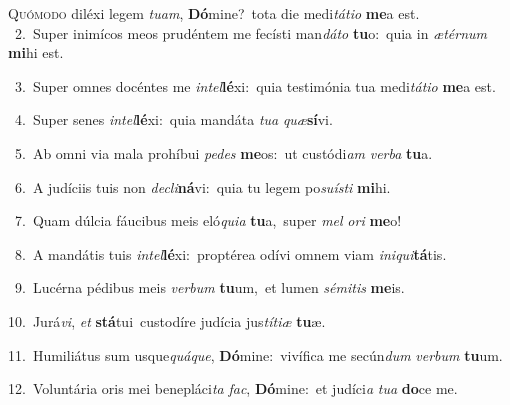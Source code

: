 \lettrine{\initial\textcolor{\initialcolor}{Q}}{uómodo} diléxi legem \textit{tu}\-\textit{am}, \textbf{Dó}\-mine?~\star tota die medi\-\textit{tá}\-\textit{ti}\textit{o} \textbf{me}\-a est.\\
{\numbfont\textcolor{\numbcolor}{~2.}}~Super inimícos meos prudéntem me fecísti man\-\textit{dá}\-\textit{to} \textbf{tu}\-o:~\star quia in \textit{æ}\-\textit{tér}\textit{num} \textbf{mi}\-hi est.\par
{\numbfont\textcolor{\numbcolor}{~3.}}~Super omnes docéntes me \textit{in}\-\textit{tel}\textbf{lé}xi:~\star quia testimónia tua medi\-\textit{tá}\-\textit{ti}\textit{o} \textbf{me}\-a est.\par
{\numbfont\textcolor{\numbcolor}{~4.}}~Super senes \textit{in}\-\textit{tel}\textbf{lé}xi:~\star quia mandáta \textit{tu}\-\textit{a} \textit{quæ}\-\textbf{sí}vi.\par
{\numbfont\textcolor{\numbcolor}{~5.}}~Ab omni via mala prohíbui \textit{pe}\-\textit{des} \textbf{me}\-os:~\star ut custódi\textit{am} \textit{ver}\-\textit{ba} \textbf{tu}\-a.\par
{\numbfont\textcolor{\numbcolor}{~6.}}~A judíciis tuis non \textit{de}\-\textit{cli}\textbf{ná}vi:~\star quia tu legem po\-\textit{su}\-\textit{ís}\textit{ti} \textbf{mi}\-hi.\par
{\numbfont\textcolor{\numbcolor}{~7.}}~Quam dúlcia fáucibus meis eló\-\textit{qui}\-\textit{a} \textbf{tu}\-a,~\star super \textit{mel} \textit{o}\-\textit{ri} \textbf{me}\-o!\par
{\numbfont\textcolor{\numbcolor}{~8.}}~A mandátis tuis \textit{in}\-\textit{tel}\textbf{lé}xi:~\star proptérea odívi omnem viam \textit{in}\-\textit{i}\textit{qui}\textbf{tá}tis.\par
{\numbfont\textcolor{\numbcolor}{~9.}}~Lucérna pédibus meis \textit{ver}\-\textit{bum} \textbf{tu}\-um,~\star et lumen \textit{sé}\-\textit{mi}\textit{tis} \textbf{me}\-is.\par
{\numbfont\textcolor{\numbcolor}{10.}}~Jurá\-\textit{vi}\-, \textit{et} \textbf{stá}\-tui~\star custodíre judícia jus\-\textit{tí}\-\textit{ti}\textit{æ} \textbf{tu}\-æ.\par
{\numbfont\textcolor{\numbcolor}{11.}}~Humiliátus sum usque\-\textit{quá}\-\textit{que}, \textbf{Dó}\-mine:~\star vivífica me secún\textit{dum} \textit{ver}\-\textit{bum} \textbf{tu}\-um.\par
{\numbfont\textcolor{\numbcolor}{12.}}~Voluntária oris mei benepláci\textit{ta} \textit{fac}\-, \textbf{Dó}\-mine:~\star et judíci\textit{a} \textit{tu}\-\textit{a} \textbf{do}\-ce me.\par
